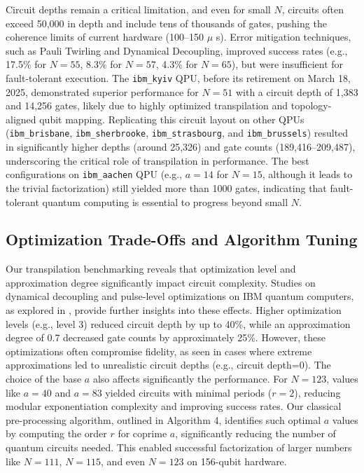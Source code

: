 \documentclass[conference,twoside]{IEEEtran}
\begin{document}
Circuit depths remain a critical limitation, and even for small $N$, circuits often exceed 50,000 in depth and include tens of thousands of gates, pushing the coherence limits of current hardware (100--150 $ \mu $ s). Error mitigation techniques, such as Pauli Twirling and Dynamical Decoupling, improved success rates (e.g., 17.5\% for $N=55$, 8.3\% for $N=57$, 4.3\% for $N=65$), but were insufficient for fault-tolerant execution. The \texttt{ibm\_kyiv} QPU, before its retirement on March 18, 2025, demonstrated superior performance for $N=51$ with a circuit depth of 1,383 and 14,256 gates, likely due to highly optimized transpilation and topology-aligned qubit mapping. Replicating this circuit layout on other QPUs (\texttt{ibm\_brisbane}, \texttt{ibm\_sherbrooke}, \texttt{ibm\_strasbourg}, and \texttt{ibm\_brussels}) resulted in significantly higher depths (around 25,326) and gate counts (189,416--209,487), underscoring the critical role of transpilation in performance. The best configurations on \texttt{ibm\_aachen} QPU (e.g., $a = 14$ for $N=15$, although it leads to the trivial factorization) still yielded more than 1000 gates, indicating that fault-tolerant quantum computing is essential to progress beyond small $N$.

\subsection{Optimization Trade-Offs and Algorithm Tuning}

Our transpilation benchmarking reveals that optimization level and approximation degree significantly impact circuit complexity. Studies on dynamical decoupling and pulse-level optimizations on IBM quantum computers, as explored in \citep*{niu2022}, provide further insights into these effects. Higher optimization levels (e.g., level 3) reduced circuit depth by up to 40\%, while an approximation degree of 0.7 decreased gate counts by approximately 25\%. However, these optimizations often compromise fidelity, as seen in cases where extreme approximations led to unrealistic circuit depths (e.g., circuit depth=0). The choice of the base $a$ also affects significantly the performance. For $N=123$, values like $a=40$ and $a=83$ yielded circuits with minimal periods ($r=2$), reducing modular exponentiation complexity and improving success rates. Our classical pre-processing algorithm, outlined in Algorithm 4, identifies such optimal $a$ values by computing the order $r$ for coprime $a$, significantly reducing the number of quantum circuits needed. This enabled successful factorization of larger numbers like $N=111$, $N=115$, and even $N=123$ on 156-qubit hardware.
\end{document}
